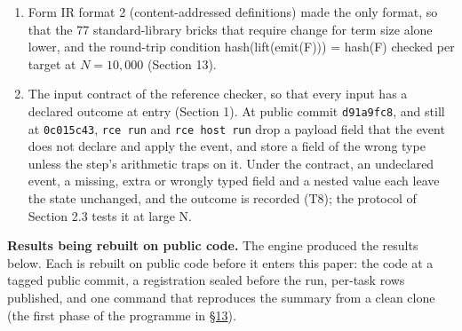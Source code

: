 \documentclass[10pt,letterpaper]{article}
\begin{document}
\begin{enumerate}
  The first \texttt{host.Calibrated} entry, on the KV260 rung with
  \(N \ge 30\), and the regression that RCE-F5 tests (Section 6.3).
\item
  Form IR format 2 (content-addressed definitions) made the only format,
  so that the 77 standard-library bricks that require change for term
  size alone lower, and the round-trip condition hash(lift(emit(F))) =
  hash(F) checked per target at \(N = 10{,}000\) (Section 13).
\item
  The input contract of the reference checker, so that every input has a
  declared outcome at entry (Section 1). At public commit
  \texttt{d91a9fc8}, and still at \texttt{0c015c43}, \texttt{rce\ run}
  and \texttt{rce\ host\ run} drop a payload field that the event does
  not declare and apply the event, and store a field of the wrong type
  unless the step's arithmetic traps on it. Under the contract, an
  undeclared event, a missing, extra or wrongly typed field and a nested
  value each leave the state unchanged, and the outcome is recorded
  (T8); the protocol of Section 2.3 tests it at large N.
\end{enumerate}

\textbf{Results being rebuilt on public code.} The engine produced the
results below. Each is rebuilt on public code before it enters this
paper: the code at a tagged public commit, a registration sealed before
the run, per-task rows published, and one command that reproduces the
summary from a clean clone (the first phase of the programme in
\href{https://research.openie.dev/papers/rce/\#13-programme-of-work-and-its-gates}{§13}).
\end{document}
